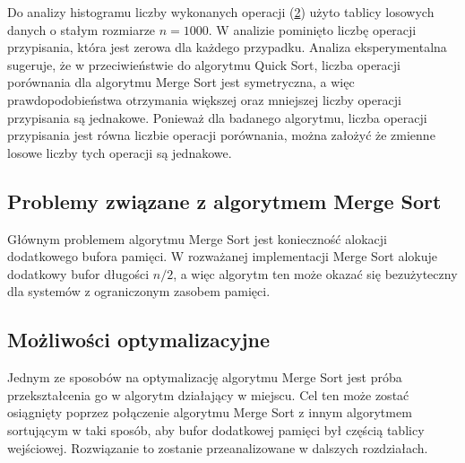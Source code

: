 Do analizy histogramu liczby wykonanych operacji (\ref{fig:merge-sort-density}) użyto tablicy losowych danych o stałym rozmiarze $n = 1000$. W analizie pominięto liczbę operacji przypisania, która jest zerowa dla każdego przypadku. Analiza eksperymentalna sugeruje, że w przeciwieństwie do algorytmu Quick Sort, liczba operacji porównania dla algorytmu Merge Sort jest symetryczna, a więc prawdopodobieństwa otrzymania większej oraz mniejszej liczby operacji przypisania są jednakowe. Ponieważ dla badanego algorytmu, liczba operacji przypisania jest równa liczbie operacji porównania, można założyć że zmienne losowe liczby tych operacji są jednakowe.

\begin{figure}[]
	\centering
	
	\caption[]{}
	\label{fig:merge-sort-optimistic-average-pessimistic-case}
\end{figure}

\begin{figure}[]
	\centering
	
	\caption[]{}
	\label{fig:merge-sort-density}
\end{figure}

\subsection{Problemy związane z algorytmem Merge Sort}
Głównym problemem algorytmu Merge Sort jest konieczność alokacji dodatkowego bufora pamięci. W rozważanej implementacji Merge Sort alokuje dodatkowy bufor długości $n/2$, a więc algorytm ten może okazać się bezużyteczny dla systemów z ograniczonym zasobem pamięci.\\

\subsection{Możliwości optymalizacyjne}
Jednym ze sposobów na optymalizację algorytmu Merge Sort jest próba przekształcenia go w algorytm działający w miejscu. Cel ten może zostać osiągnięty poprzez połączenie algorytmu Merge Sort z innym algorytmem sortującym w taki sposób, aby bufor dodatkowej pamięci był częścią tablicy wejściowej. Rozwiązanie to zostanie przeanalizowane w dalszych rozdziałach.\\
